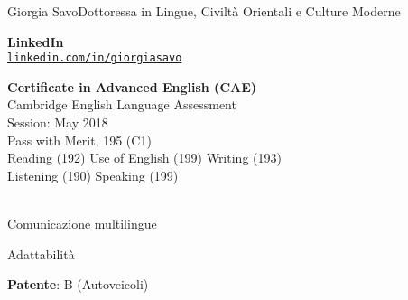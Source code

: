 \documentclass{article}
\begin{document}
\begin{cv}[avatar]{Giorgia Savo}{Dottoressa in Lingue, Civiltà Orientali e Culture Moderne}
\cvseparator[3]
\begin{cvitem}[Linkedin][5]
	\textbf{LinkedIn}\\
	\href{www.linkedin.com/in/giorgiasavo}{\texttt{linkedin.com/in/giorgiasavo}}
\end{cvitem}



\scriptsize \textbf{Certificate in Advanced English (CAE)}\\
Cambridge English Language Assessment\\
Session: May 2018\\
Pass with Merit, 195 (C1)\\
Reading (192) Use of English (199) Writing (193)\\Listening (190) Speaking (199)\\
\\
\normalsize
{}
\normalsize


\begin{cvitem}
    Comunicazione multilingue
\end{cvitem}

\cvseparator
\begin{cvitem}
    Adattabilità
\end{cvitem}


\begin{cvitem}
	\textbf{Patente}: B (Autoveicoli)
\end{cvitem}


\end{cv}

\end{document}
